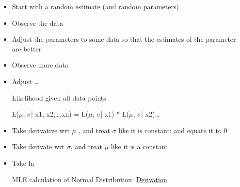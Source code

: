 \documentclass[11pt]{article}
\begin{document}
\begin{itemize}
\item Start with a random estimate (and random parameters)
\item Observe the data
\item Adjust the parameters to some data so that the estimates of the parameter are better
\item Observe more data
\item Adjust \ldots{}

Likelihood given all data points

L(\(\mu\), \(\sigma\)| x1, x2,\ldots{},xn) =  L(\(\mu\), \(\sigma\)| x1) *  L(\(\mu\), \(\sigma\)| x2)\ldots{}

\item Take derivative wrt \(\mu\) , and treat \(\sigma\) like it is constant; and equate it to 0
\item Take derivate wrt \(\sigma\), and treat \(\mu\) like it is a constant
\item Take ln

MLE calculation of Normal Distribution:
\href{./mle-normal-dist.pdf}{Derivation}
\end{itemize}
\end{document}
